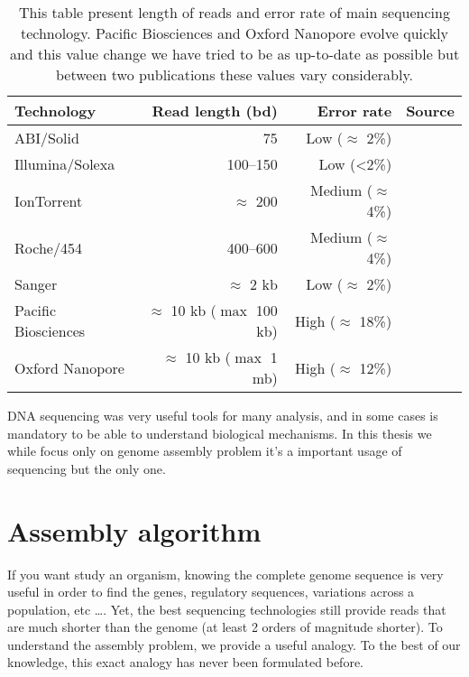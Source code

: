 \documentclass[./main.tex]{subfiles}
\begin{document}
\begin{table}[ht]
    \centering
    \begin{tabular}{l|rr|l}
         Technology          & Read length (bd)                 & Error rate    & Source                          \\ \hline
         ABI/Solid           & 75                               & Low ($\approx$ 2\%)    & \cite{seq_assembly_demystified} \\
         Illumina/Solexa     & 100–150                          & Low (<2\%)             & \cite{seq_assembly_demystified} \\
         IonTorrent          & $\approx$ 200                    & Medium ($\approx$ 4\%) & \cite{seq_assembly_demystified} \\
         Roche/454           & 400–600                          & Medium ($\approx$ 4\%) & \cite{seq_assembly_demystified} \\
         Sanger              & $\approx$ 2 kb                   & Low ($\approx$ 2\%)    & \cite{seq_assembly_demystified} \\
         Pacific Biosciences & $\approx$ 10 kb ($\max$ 100 kb)  & High ($\approx$ 18\%)  & \cite{seq_assembly_demystified} \cite{longread_dark_matter} \\
         Oxford Nanopore     & $\approx$ 10 kb ($\max$ 1 mb)    & High ($\approx$ 12\%)  & \cite{longread_dark_matter} \cite{nanopore_read_accuracy} \\
    \end{tabular}
    \caption{This table present length of reads and error rate of main sequencing technology. Pacific Biosciences and Oxford Nanopore evolve quickly and this value change we have tried to be as up-to-date as possible but between two publications these values vary considerably.}
    \label{intro:tab:technology_property}
\end{table}


DNA sequencing was very useful tools for many analysis, and in some cases is mandatory to be able to understand biological mechanisms. In this thesis we while focus only on genome assembly problem it's a important usage of sequencing but the only one.

\section{Assembly algorithm}

If you want study an organism, knowing the complete genome sequence is very useful in order to find the genes, regulatory sequences, variations across a population, etc …. Yet, the best sequencing technologies still provide reads that are much shorter than the genome (at least 2 orders of magnitude shorter). To understand the assembly problem, we provide a useful analogy. To the best of our knowledge, this exact analogy has never been formulated before.
\end{document}
